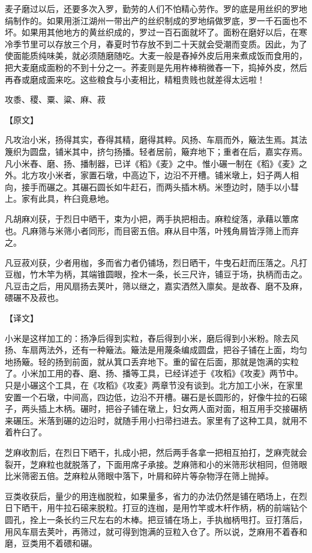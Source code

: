 \documentclass[12pt,UTF8]{ctexbook}
\begin{document}
麦子磨过以后，还要多次入罗，勤劳的人们不怕精心劳作。罗的底是用丝织的罗地绢制作的。如果用浙江湖州一带出产的丝织制成的罗地绢做罗底，罗一千石面也不坏。如果用其他地方的黄丝织成的，罗过一百石面就坏了。面粉在磨好以后，在寒冷季节里可以存放三个月，春夏时节存放不到二十天就会受潮而变质。因此，为了使面能质纯味美，就必须随磨随吃。大麦一般是舂掉外皮后用来煮成饭而食用的，把大麦磨成面粉的不到十分之一。荞麦则是先用杵棒稍微舂一下，捣掉外皮，然后再舂或磨成面来吃。这些粮食与小麦相比，精粗贵贱也就差得太远啦！

攻黍、稷、粟、粱、麻、菽

【原文】

凡攻治小米，扬得其实，舂得其精，磨得其粹。风扬、车扇而外，簸法生焉。其法篾织为圆盘，铺米其中，挤匀扬播。轻者居前，簸弃地下；重者在后，嘉实存焉。凡小米舂、磨、扬、播制器，已详《稻》《麦》之中。惟小碾一制在《稻》《麦》之外。北方攻小米者，家置石墩，中高边下，边沿不开槽。铺米墩上，妇子两人相向，接手而碾之。其碾石圆长如牛赶石，而两头插木柄。米堕边时，随手以小彗上。家有此具，杵臼竟悬地。

凡胡麻刈获，于烈日中晒干，束为小把，两手执把相击。麻粒绽落，承藉以簟席也。凡麻筛与米筛小者同形，而目密五倍。麻从目中落，叶残角屑皆浮筛上而弃之。

凡豆菽刈获，少者用枷，多而省力者仍铺场，烈日晒干，牛曳石赶而压落之。凡打豆枷，竹木竿为柄，其端锥圆眼，拴木一条，长三尺许，铺豆于场，执柄而击之。凡豆击之后，用风扇扬去荚叶，筛以继之，嘉实洒然入廪矣。是故舂、磨不及麻，碨碾不及菽也。

【译文】

小米是这样加工的：扬净后得到实粒，舂后得到小米，磨后得到小米粉。除去风扬、车扇两法外，还有一种簸法。簸法是用蔑条编成圆盘，把谷子铺在上面，均匀地扬簸。轻的扬到前面，就从箕口丢弃地下。重的留在后面，那就是饱满的实粒了。小米加工用的舂、磨、扬、播等工具，已经详述于《攻稻》《攻麦》两节中。只是小碾这个工具，在《攻稻》《攻麦》两章节没有谈到。北方加工小米，在家里安置一个石墩，中间高，四边低，边沿不开槽。碾石是长圆形的，好像牛拉的石磙子，两头插上木柄。碾时，把谷子铺在墩上，妇女两人面对面，相互用手交接碾柄来碾压。米落到碾的边沿时，就随手用小扫帚扫进去。家里有了这种工具，就用不着杵臼了。

芝麻收割后，在烈日下晒干，扎成小把，然后两手各拿一把相互拍打，芝麻壳就会裂开，芝麻粒也就脱落了，下面用席子承接。芝麻筛和小的米筛形状相同，但筛眼比米筛密五倍。芝麻粒从筛眼中落下，叶屑和碎片等杂物浮在筛上抛掉。

豆类收获后，量少的用连枷脱粒，如果量多，省力的办法仍然是铺在晒场上，在烈日下晒干，用牛拉石磙来脱粒。打豆的连枷，是用竹竿或木杆作柄，柄的前端钻个圆孔，拴上一条长约三尺左右的木棒。把豆铺在场上，手执枷柄甩打。豆打落后，用风车扇去荚叶，再筛过，就可得到饱满的豆粒入仓了。所以说，芝麻用不着舂和磨，豆类用不着碨和碾。
\end{document}
